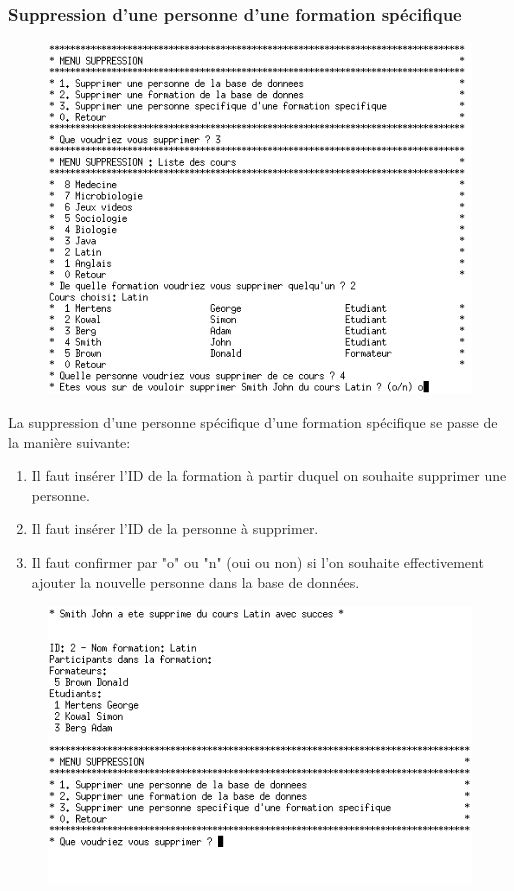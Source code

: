 \documentclass[11pt]{article}
\begin{document}
\subsubsection{Suppression d'une personne d'une formation spécifique}
\begin{figure}[ht]
  \centering
  \includegraphics[trim=0 0 0 0, clip, scale=0.7]{images/19.png.png}
\end{figure}
La suppression d'une personne spécifique d'une formation spécifique se passe de la manière suivante:
\begin{enumerate}
\item Il faut insérer l'ID de la formation à partir duquel on souhaite supprimer une personne.
\item Il faut insérer l'ID de la personne à supprimer.
\item Il faut confirmer par "o" ou "n" (oui ou non) si l'on souhaite effectivement ajouter la nouvelle personne dans la base de données.
\end{enumerate}

\begin{figure}[ht]
  \centering
  \includegraphics[trim=0 30 0 0, clip, scale=0.7]{images/20.png.png}
\end{figure}
\end{document}
